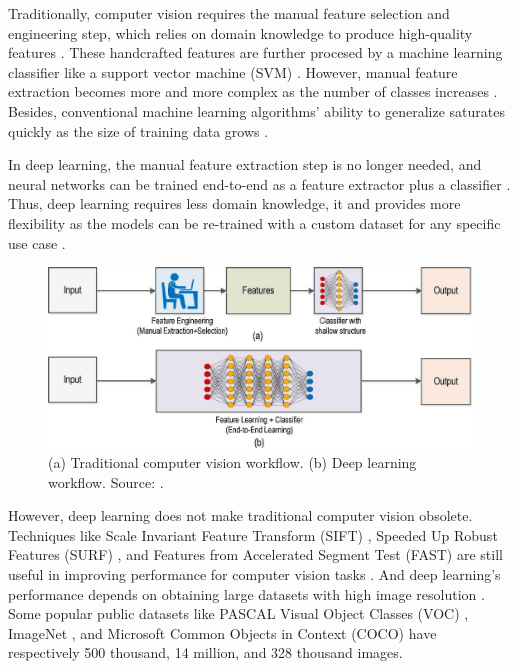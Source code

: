 \documentclass[a4paper, 11pt, oneside]{article}
\begin{document}
  Traditionally, computer vision requires the manual feature selection and engineering step, which relies on domain knowledge
  to produce high-quality features \cite{elgendy2020deep, zhao2019object, o2019deep}. These handcrafted features are further
  procesed by a machine learning classifier like a support vector machine (SVM)
  \cite{elgendy2020deep, zhao2019object, o2019deep}. However, manual feature extraction becomes more and more complex as
  the number of classes increases \cite{o2019deep}. Besides, conventional machine learning algorithms' ability to
  generalize saturates quickly as the size of training data grows \cite{qin2015underwater}.

  In deep learning, the manual feature extraction step is no longer needed, and neural networks can be trained end-to-end
  as a feature extractor plus a classifier \cite{elgendy2020deep, o2019deep}. Thus, deep learning requires less domain
  knowledge, it and provides more flexibility as the models can be re-trained with a custom dataset for any specific use
  case \cite{o2019deep}.

  \begin{figure}[ht]
    \begin{center}
      \includegraphics[width=.8\textwidth]{deep_learning_vs_traditional_computer_vision.png}
    \end{center}
    \caption{(a) Traditional computer vision workflow. (b) Deep learning workflow. Source: \cite{o2019deep}.}
  \end{figure}

  However, deep learning does not make traditional computer vision obsolete. Techniques like Scale Invariant Feature Transform
  (SIFT) \cite{karami2017image}, Speeded Up Robust Features (SURF) \cite{bay2006surf}, and Features from Accelerated
  Segment Test (FAST) \cite{rosten2006machine} are still useful in improving performance for computer vision tasks
  \cite{o2019deep}. And deep learning's performance depends on obtaining large datasets with high image resolution \cite{o2019deep}.
  Some popular public datasets like PASCAL Visual Object Classes (VOC) \cite{everingham2010pascal}, ImageNet
  \cite{russakovsky2015imagenet}, and Microsoft Common Objects in Context (COCO) \cite{lin2014microsoft}
  have respectively 500 thousand, 14 million, and 328 thousand images.
\end{document}
